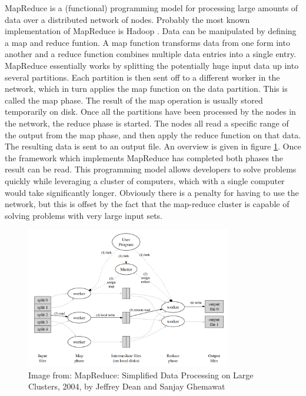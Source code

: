 MapReduce is a (functional) programming model for processing large amounts of data over a distributed network of nodes. Probably the most known implementation of MapReduce is Hadoop \cite{Hadoop}. Data can be manipulated by defining a map and reduce funtion. A map function transforms data from one form into another and a reduce function combines multiple data entries into a single entry. MapReduce essentially works by splitting the potentially huge input data up into several partitions. Each partition is then sent off to a different worker in the network, which in turn applies the map function on the data partition. This is called the map phase. The result of the map operation is usually stored temporarily on disk. Once all the partitions have been processed by the nodes in the network, the reduce phase is started. The nodes all read a specific range of the output from the map phase, and then apply the reduce function on that data. The resulting data is sent to an output file. An overview is given in figure \ref{fig:mapreduce}. Once the framework which implements MapReduce has completed both phases the result can be read. This programming model allows developers to solve problems quickly while leveraging a cluster of computers, which with a single computer would take significantly longer. Obviously there is a penalty for having to use the network, but this is offset by the fact that the map-reduce cluster is capable of solving problems with very large input sets.

\begin{figure}[htb]
\includegraphics[width=340px]{mapreduce.png}
\caption{Image from: MapReduce: Simplified Data Processing on Large Clusters, 2004, by Jeffrey Dean and Sanjay Ghemawat}
\label{fig:mapreduce}
\end{figure}
